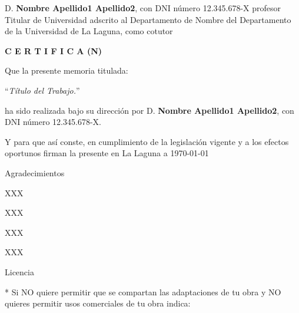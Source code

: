 \documentclass[spanish,a4paper,14pt,oneside]{extreport}
\begin{document}
{\bigskip
D. {\bf Nombre Apellido1 Apellido2}, con DNI número 12.345.678-X
profesor
Titular de Universidad
adscrito al Departamento
de Nombre del Departamento
de la Universidad de La Laguna, como cotutor

\bigskip
\bigskip
{\bf C E R T I F I C A (N)}

\bigskip
\bigskip
\bigskip
Que la presente memoria titulada:

\bigskip
``{\it Título del Trabajo.}''

\bigskip
\bigskip
\bigskip

\noindent ha sido realizada bajo su dirección por D. {\bf Nombre Apellido1 Apellido2},
con DNI número 12.345.678-X.

\bigskip
\bigskip

Y para que así conste, en cumplimiento de la legislación vigente y a los efectos
oportunos firman la presente en La Laguna a \today

\newpage
\thispagestyle{empty}

{ \flushright

\begin{LARGE}
Agradecimientos
\end{LARGE}

\hspace{3mm}

\begin{large}


\hspace{3mm}
XXX

\hspace{3mm}
XXX


\hspace{3mm}
XXX


\hspace{3mm}
XXX


\end{large}

}

\newpage

\begin{huge}
Licencia
\end{huge}

\bigskip
* Si NO quiere permitir que se compartan las adaptaciones de tu obra
y NO quieres permitir usos comerciales de tu obra indica:


}
\end{document}
